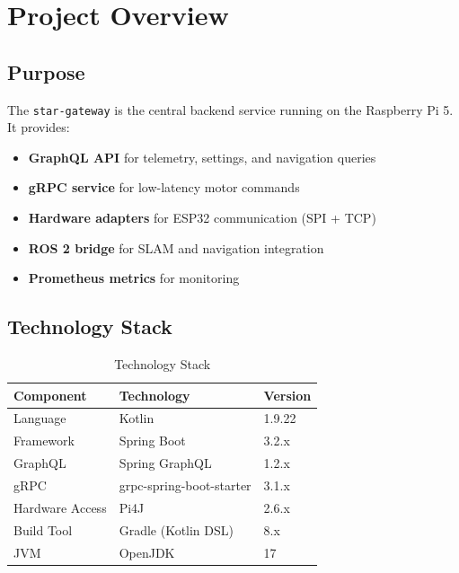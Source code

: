 \section{Project Overview}

\subsection{Purpose}

The \texttt{star-gateway} is the central backend service running on the Raspberry Pi 5. It provides:

\begin{itemize}
    \item \textbf{GraphQL API} for telemetry, settings, and navigation queries
    \item \textbf{gRPC service} for low-latency motor commands
    \item \textbf{Hardware adapters} for ESP32 communication (SPI + TCP)
    \item \textbf{ROS 2 bridge} for SLAM and navigation integration
    \item \textbf{Prometheus metrics} for monitoring
\end{itemize}

\subsection{Technology Stack}

\begin{table}[H]
\centering
\begin{tabular}{|l|l|l|}
\hline
\textbf{Component} & \textbf{Technology} & \textbf{Version} \\
\hline
Language & Kotlin & 1.9.22 \\
Framework & Spring Boot & 3.2.x \\
GraphQL & Spring GraphQL & 1.2.x \\
gRPC & grpc-spring-boot-starter & 3.1.x \\
Hardware Access & Pi4J & 2.6.x \\
Build Tool & Gradle (Kotlin DSL) & 8.x \\
JVM & OpenJDK & 17 \\
\hline
\end{tabular}
\caption{Technology Stack}
\end{table}

